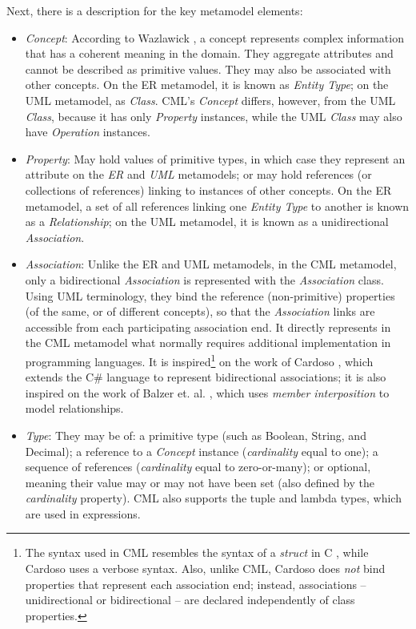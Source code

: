 Next, there is a description for the key metamodel elements:

\begin{itemize}

\item \emph{Concept}: According to Wazlawick \cite{wazlawick},
a concept represents complex information that has a coherent meaning in the domain.
They aggregate attributes and cannot be described as primitive values.
They may also be associated with other concepts.
On the ER metamodel, it is known as \emph{Entity Type};
on the UML metamodel, as \emph{Class}.
CML's \emph{Concept} differs, however, from the UML \emph{Class},
because it has only \emph{Property} instances,
while the UML \emph{Class} may also have \emph{Operation} instances.

\item \emph{Property}: May hold values of primitive types, in which case they represent an attribute on the \emph{ER} and \emph{UML} metamodels;
or may hold references (or collections of references) linking to instances of other concepts.
On the ER metamodel,
a set of all references linking one \emph{Entity Type} to another is known as a \emph{Relationship};
on the UML metamodel, it is known as a unidirectional \emph{Association}.

\item \emph{Association}: Unlike the ER and UML metamodels, in the CML metamodel,
only a bidirectional \emph{Association} is represented with the \emph{Association} class.
Using UML terminology, they bind the reference (non-primitive) properties (of the same, or of different concepts),
so that the \emph{Association} links are accessible from each participating association end.
It directly represents in the CML metamodel what normally requires additional implementation in programming languages.
It is inspired\footnote{The syntax used in CML resembles the syntax of a \emph{struct} in C \cite{clang}, while Cardoso \cite{cardoso} uses a verbose syntax. Also, unlike CML, Cardoso does \emph{not} bind properties that represent each association end; instead, associations -- unidirectional or bidirectional -- are declared independently of class properties.} on the work of Cardoso \cite{cardoso}, which extends the C\# language to represent bidirectional associations; it is also inspired on the work of Balzer et. al. \cite{balzer}, which uses \emph{member interposition} to model relationships.

\item \emph{Type}: They may be of: a primitive type (such as Boolean, String, and Decimal); a reference to a \emph{Concept} instance (\emph{cardinality} equal to one); a sequence of references (\emph{cardinality} equal to zero-or-many); or optional, meaning their value may or may not have been set (also defined by the \emph{cardinality} property).
CML also supports the tuple and lambda types, which are used in expressions.


\end{itemize}
